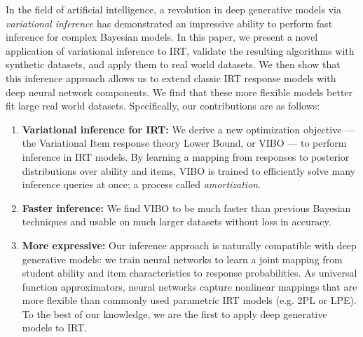 In the field of artificial intelligence, a revolution in deep generative models via \emph{variational inference} \cite{kingma2013auto,rezende2014stochastic} has demonstrated an impressive ability to perform fast inference for complex Bayesian models.
In this paper, we present a novel application of variational inference to IRT, validate the resulting algorithms with synthetic datasets, and apply them to real world datasets.
We then show that this inference approach allows us to extend classic IRT response models with deep neural network components. We find that these more flexible models better fit large real world datasets.
Specifically, our contributions are as follows:

\begin{enumerate}
    \item \textbf{Variational inference for IRT:} We derive a new optimization objective --- the Variational Item response theory Lower Bound, or VIBO --- to perform inference in IRT models.
    By learning a mapping from responses to posterior distributions over ability and items, VIBO is 
    trained to efficiently solve many inference queries at once; a process called \textit{amortization}.
    \item \textbf{Faster inference:}
    We find VIBO to be much faster than previous Bayesian techniques and usable on much larger datasets without loss in accuracy.
    \item \textbf{More expressive:} Our inference approach is naturally compatible with deep generative models: we train neural networks to learn a joint mapping from student ability and item characteristics to response probabilities. As universal function approximators, neural networks capture nonlinear mappings that are more flexible than commonly used parametric IRT models (e.g. 2PL or LPE).
    To the best of our knowledge, we are the first to apply deep generative models to IRT. %

\end{enumerate}
